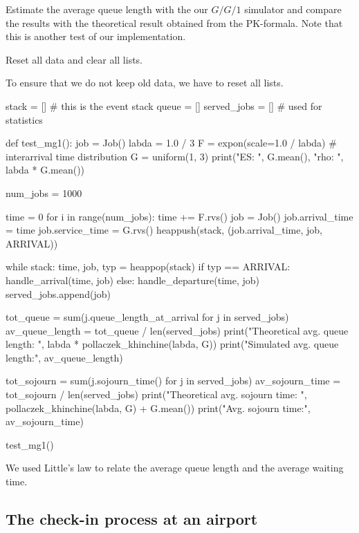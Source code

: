 \begin{exercise}
  Estimate the average queue length with the our $G/G/1$ simulator and compare the results with the theoretical result obtained from the PK-formala.
  Note that this is another test of our implementation.
\begin{hint}
Reset all data and clear all lists.
\end{hint}

\begin{solution}
To ensure that we do not keep old data, we have to reset all lists.

\begin{pyverbatim}
stack = []  # this is the event stack
queue = []
served_jobs = []  # used for statistics


def test_mg1():
    job = Job()
    labda = 1.0 / 3
    F = expon(scale=1.0 / labda)  # interarrival time distribution
    G = uniform(1, 3)
    print("ES: ", G.mean(), "rho: ", labda * G.mean())

    num_jobs = 1000

    time = 0
    for i in range(num_jobs):
        time += F.rvs()
        job = Job()
        job.arrival_time = time
        job.service_time = G.rvs()
        heappush(stack, (job.arrival_time, job, ARRIVAL))

    while stack:
        time, job, typ = heappop(stack)
        if typ == ARRIVAL:
            handle_arrival(time, job)
        else:
            handle_departure(time, job)
            served_jobs.append(job)

    tot_queue = sum(j.queue_length_at_arrival for j in served_jobs)
    av_queue_length = tot_queue / len(served_jobs)
    print("Theoretical avg. queue length: ", labda * pollaczek_khinchine(labda, G))
    print("Simulated avg. queue length:", av_queue_length)

    tot_sojourn = sum(j.sojourn_time() for j in served_jobs)
    av_sojourn_time = tot_sojourn / len(served_jobs)
    print("Theoretical avg. sojourn time: ", pollaczek_khinchine(labda, G) + G.mean())
    print("Avg. sojourn time:", av_sojourn_time)


test_mg1()
\end{pyverbatim}
We used Little's law to relate the average queue length and the average waiting time.
  \end{solution}
\end{exercise}




\subsection{The check-in process at an airport}
\label{sec:check-in-process-at}

